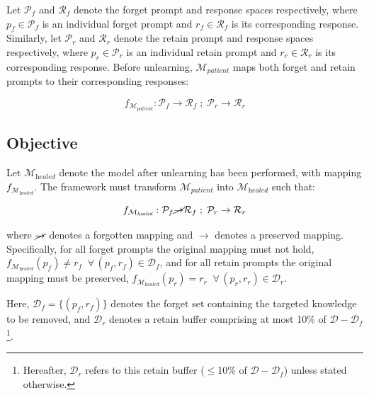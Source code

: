 Let $\mathcal{P}_f$ and $\mathcal{R}_f$ denote the forget prompt and response spaces respectively, where $p_f \in \mathcal{P}_f$ is an individual forget prompt and $r_f \in \mathcal{R}_f$ is its corresponding response. Similarly, let $\mathcal{P}_r$ and $\mathcal{R}_r$ denote the retain prompt and response spaces respectively, where $p_r \in \mathcal{P}_r$ is an individual retain prompt and $r_r \in \mathcal{R}_r$ is its corresponding response. Before unlearning, $\mathcal{M}_{\textit{patient}}$ maps both forget and retain prompts to their corresponding responses:

\begin{equation}
f_{\mathcal{M}_{\textit{patient}}} : \mathcal{P}_f \rightarrow \mathcal{R}_f \;;\; \mathcal{P}_r \rightarrow \mathcal{R}_r
\label{eq:before_unlearn}
\end{equation}

\subsection{Objective}\label{subsec:repair_objective}

Let $\mathcal{M}_{\textit{healed}}$ denote the model after unlearning has been performed, with mapping $f_{\mathcal{M}_{\textit{healed}}}$. The framework must transform $\mathcal{M}_{\textit{patient}}$ into $\mathcal{M}_{\textit{healed}}$ such that:

\begin{equation}
f_{\mathcal{M}_{\textit{healed}}} : \mathcal{P}_f \cancel{\rightarrow} \mathcal{R}_f \;;\; \mathcal{P}_r \rightarrow \mathcal{R}_r
\label{eq:after_unlearn}
\end{equation}

where $\cancel{\rightarrow}$ denotes a forgotten mapping and $\rightarrow$ denotes a preserved mapping. Specifically, for all forget prompts the original mapping must not hold, $f_{\mathcal{M}_{\textit{healed}}}(p_f) \neq r_f \;\; \forall \, (p_f, r_f) \in \mathcal{D}_f$, and for all retain prompts the original mapping must be preserved, $f_{\mathcal{M}_{\textit{healed}}}(p_r) = r_r \;\; \forall \, (p_r, r_r) \in \mathcal{D}_r$.

Here, $\mathcal{D}_f = \{(p_f, r_f)\}$ denotes the forget set containing the targeted knowledge to be removed, and $\mathcal{D}_r$ denotes a retain buffer comprising at most 10\% of $\mathcal{D} - \mathcal{D}_f$\footnote{Hereafter, $\mathcal{D}_r$ refers to this retain buffer ($\leq$10\% of $\mathcal{D} - \mathcal{D}_f$) unless stated otherwise.}.

